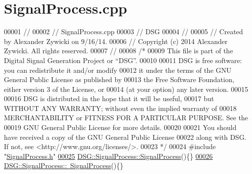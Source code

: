 \hypertarget{_signal_process_8cpp_source}{\section{Signal\+Process.\+cpp}
\label{_signal_process_8cpp_source}
}

\begin{DoxyCode}
00001 \textcolor{comment}{//}
00002 \textcolor{comment}{//  SignalProcess.cpp}
00003 \textcolor{comment}{//  DSG}
00004 \textcolor{comment}{//}
00005 \textcolor{comment}{//  Created by Alexander Zywicki on 9/16/14.}
00006 \textcolor{comment}{//  Copyright (c) 2014 Alexander Zywicki. All rights reserved.}
00007 \textcolor{comment}{//}
00008 \textcolor{comment}{/*}
00009 \textcolor{comment}{ This file is part of the Digital Signal Generation Project or “DSG”.}
00010 \textcolor{comment}{}
00011 \textcolor{comment}{ DSG is free software: you can redistribute it and/or modify}
00012 \textcolor{comment}{ it under the terms of the GNU General Public License as published by}
00013 \textcolor{comment}{ the Free Software Foundation, either version 3 of the License, or}
00014 \textcolor{comment}{ (at your option) any later version.}
00015 \textcolor{comment}{}
00016 \textcolor{comment}{ DSG is distributed in the hope that it will be useful,}
00017 \textcolor{comment}{ but WITHOUT ANY WARRANTY; without even the implied warranty of}
00018 \textcolor{comment}{ MERCHANTABILITY or FITNESS FOR A PARTICULAR PURPOSE.  See the}
00019 \textcolor{comment}{ GNU General Public License for more details.}
00020 \textcolor{comment}{}
00021 \textcolor{comment}{ You should have received a copy of the GNU General Public License}
00022 \textcolor{comment}{ along with DSG.  If not, see <http://www.gnu.org/licenses/>.}
00023 \textcolor{comment}{ */}
00024 \textcolor{preprocessor}{#include "\hyperlink{_signal_process_8h}{SignalProcess.h}"}
\hypertarget{_signal_process_8cpp_source_l00025}{}\hyperlink{class_d_s_g_1_1_signal_process_a3fd4347483bcf3cc0a3d7bf98ff56218}{00025} \hyperlink{class_d_s_g_1_1_signal_process_a3fd4347483bcf3cc0a3d7bf98ff56218}{DSG::SignalProcess::SignalProcess}()\{\}
\hypertarget{_signal_process_8cpp_source_l00026}{}\hyperlink{class_d_s_g_1_1_signal_process_ad9b6a758241a092ddc38e13effc9553f}{00026} \hyperlink{class_d_s_g_1_1_signal_process_ad9b6a758241a092ddc38e13effc9553f}{DSG::SignalProcess::~SignalProcess}()\{\}
\end{DoxyCode}

